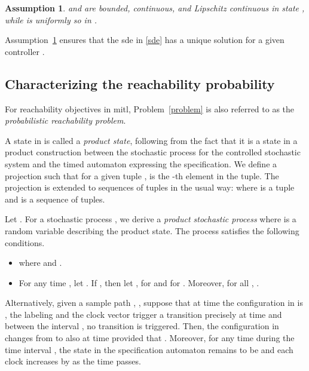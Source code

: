 \documentclass[letterpaper, 10 pt, conference]{ieeeconf}
\newtheorem{assumption}{Assumption}
\begin{document}
\begin{assumption}\label{assumption1}
   and  are bounded, continuous, and Lipschitz
  continuous in state , while  is uniformly so in .
\end{assumption}
Assumption~\ref{assumption1} ensures that the \ac{sde} in \eqref{sde}
has a unique solution for a given controller .





\subsection{Characterizing the reachability probability}
For reachability objectives in \ac{mitl}, Problem~\ref{problem} is
also referred to as the \emph{probabilistic reachability problem}.













A state in  is called a \emph{product state},
following from the fact that it is a state in a product construction
between the stochastic process for the controlled stochastic system
and the timed automaton expressing the specification. We define a
projection  such that for a given tuple ,  is the
-th element in the tuple. The projection  is extended to
sequences of tuples in the usual way:
 where  is a tuple and  is
a sequence of tuples.

Let . For a stochastic process
, we derive a \emph{product stochastic process}
 where  is a random
variable describing the product state. The process  satisfies the following conditions.
\begin{itemize}
\item  where  and
  .
\item For any time , let
  .
  If , then let
  ,  for
   and  for . Moreover,
  for all ,
  .
\end{itemize}

Alternatively, given a sample path ,
, suppose that at time  the configuration in
 is , the labeling 
and the clock vector  trigger a transition precisely
at time  and between the interval ,
no transition is triggered. Then, the configuration in 
changes from  to  also at time  provided
that .
Moreover, for any time  during the time interval
, the state in the specification automaton
remains to be  and each clock increases by  as the time passes.
\end{document}
